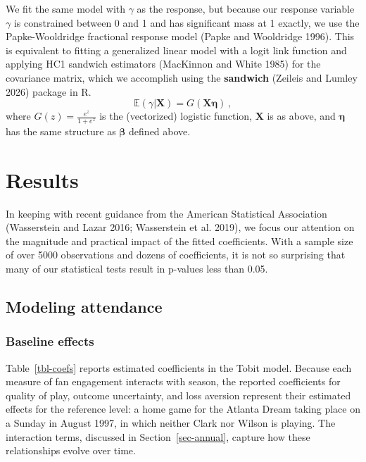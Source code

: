 \documentclass[
  letterpaper,
  DIV=11,
  numbers=noendperiod]{scrartcl}
\begin{document}
We fit the same model with \(\gamma\) as the response, but because our
response variable \(\gamma\) is constrained between 0 and 1 and has
significant mass at 1 exactly, we use the Papke-Wooldridge fractional
response model (Papke and Wooldridge 1996). This is equivalent to
fitting a generalized linear model with a logit link function and
applying HC1 sandwich estimators (MacKinnon and White 1985) for the
covariance matrix, which we accomplish using the \textbf{sandwich}
(Zeileis and Lumley 2026) package in R. \[
  \mathbb{E}{(\gamma | \symbf{X})} = G(\symbf{X} \symbf{\eta}) \,,
\] where \(G(z) = \frac{e^z}{1 + e^z}\) is the (vectorized) logistic
function, \(\symbf{X}\) is as above, and \(\symbf{\eta}\) has the same
structure as \(\symbf{\beta}\) defined above.

\section{Results}\label{results}

In keeping with recent guidance from the American Statistical
Association (Wasserstein and Lazar 2016; Wasserstein et al. 2019), we
focus our attention on the magnitude and practical impact of the fitted
coefficients. With a sample size of over 5000 observations and dozens of
coefficients, it is not so surprising that many of our statistical tests
result in p-values less than 0.05.

\subsection{Modeling attendance}\label{sec-attend}

\subsubsection{Baseline effects}\label{baseline-effects}

Table~\ref{tbl-coefs} reports estimated coefficients in the Tobit model.
Because each measure of fan engagement interacts with season, the
reported coefficients for quality of play, outcome uncertainty, and loss
aversion represent their estimated effects for the reference level: a
home game for the Atlanta Dream taking place on a Sunday in August 1997,
in which neither Clark nor Wilson is playing. The interaction terms,
discussed in Section~\ref{sec-annual}, capture how these relationships
evolve over time.
\end{document}
